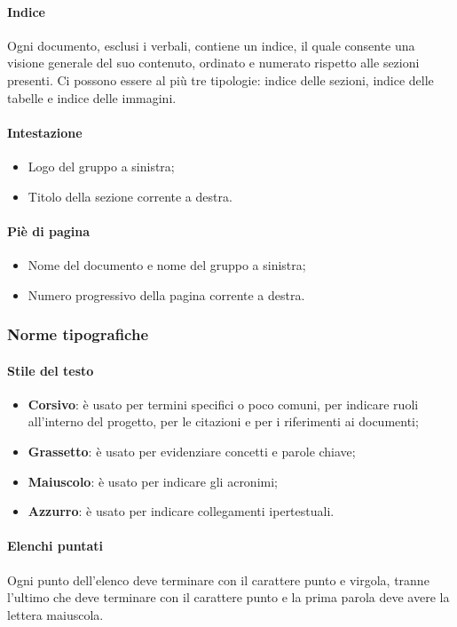 \paragraph{Indice} \Spazio
Ogni documento, esclusi i verbali, contiene un indice, il quale consente una visione generale del suo contenuto, ordinato e numerato rispetto alle sezioni presenti.
Ci possono essere al più tre tipologie: indice delle sezioni, indice delle tabelle e indice delle immagini. 

\paragraph{Intestazione}
\begin{itemize}
	\item Logo del gruppo a sinistra;
	\item Titolo della sezione corrente a destra.
\end{itemize}


\paragraph{Piè di pagina}
\begin{itemize}
	\item Nome del documento e nome del gruppo a sinistra;
	\item Numero progressivo della pagina corrente a destra.
\end{itemize}

\subsubsection{Norme tipografiche}
\paragraph{Stile del testo}
	\begin{itemize}
		\item \textbf{Corsivo}: è usato per termini specifici o poco comuni, per indicare ruoli all’interno del progetto, per le citazioni e per i riferimenti ai documenti;
		\item \textbf{Grassetto}: è usato per evidenziare concetti e parole chiave;
		\item \textbf{Maiuscolo}: è usato per indicare gli acronimi;
		\item \textbf{Azzurro}: è usato per indicare collegamenti ipertestuali.
	\end{itemize}
\paragraph{Elenchi puntati} \Spazio
	Ogni punto dell'elenco deve terminare con il carattere punto e virgola, tranne l'ultimo che deve terminare con il carattere punto e la prima parola deve avere la lettera maiuscola.

